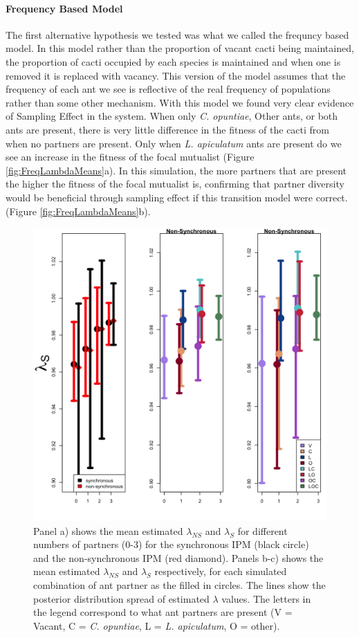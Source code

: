 \documentclass[11pt]{article}
\begin{document}
\paragraph{Frequency Based Model}
The first alternative hypothesis we tested was what we called the frequncy based model.
In this model rather than the proportion of vacant cacti being maintained, the proportion of cacti occupied by each species is maintained and when one is removed it is replaced with vacancy.
This version of the model assumes that the frequency of each ant we see is reflective of the real frequency of populations rather than some other mechanism.
With this model we found very clear evidence of Sampling Effect in the system. 
When only  \textit{C. opuntiae}, Other ants, or both ants are present, there is very little difference in the fitness of the cacti from when no partners are present. 
Only when \textit{L. apiculatum} ants are present do we see an increase in the fitness of the focal mutualist (Figure \ref{fig:FreqLambdaMeans}a).
In this simulation, the more partners that are present the higher the fitness of the focal mutualist is, confirming that partner diversity would be beneficial through sampling effect if this transition model were correct.  (Figure \ref{fig:FreqLambdaMeans}b).

\begin{figure}
\includegraphics[width=0.91\linewidth]{Figures/Lambdas_Freq_lines.png}
	\caption{Panel a) shows the mean estimated $\lambda_{NS}$ and $\lambda_{S}$ for different numbers of partners (0-3) for the synchronous IPM (black circle) and the non-synchronous IPM (red diamond). Panels b-c) shows the mean estimated $\lambda_{NS}$ and $\lambda_{S}$ respectively, for each simulated combination of ant partner as the filled in circles. The lines show the posterior distribution spread of estimated $\lambda$ values. The letters in the legend correspond to what ant partners are present (V = Vacant, C = \textit{C. opuntiae}, L = \textit{L. apiculatum}, O = other). }
\label{app:FreqLambdaMeans}
\end{figure}
\end{document}
